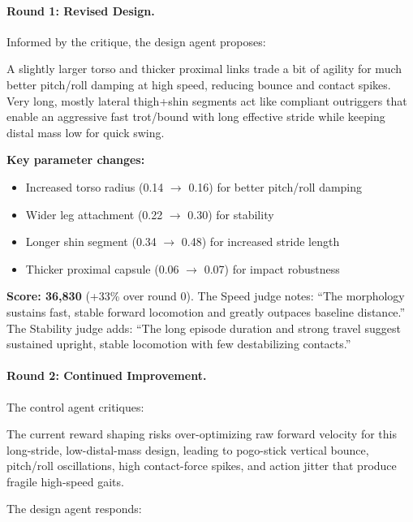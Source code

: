 \paragraph{Round 1: Revised Design.}
Informed by the critique, the design agent proposes:

\begin{promptbox}
A slightly larger torso and thicker proximal links trade a bit of agility for much better pitch/roll damping at high speed, reducing bounce and contact spikes. Very long, mostly lateral thigh+shin segments act like compliant outriggers that enable an aggressive fast trot/bound with long effective stride while keeping distal mass low for quick swing.
\end{promptbox}

\noindent\textbf{Key parameter changes:}
\begin{itemize}[nosep,leftmargin=*]
    \item Increased torso radius (0.14 $\to$ 0.16) for better pitch/roll damping
    \item Wider leg attachment (0.22 $\to$ 0.30) for stability
    \item Longer shin segment (0.34 $\to$ 0.48) for increased stride length
    \item Thicker proximal capsule (0.06 $\to$ 0.07) for impact robustness
\end{itemize}

\noindent\textbf{Score: 36,830} (+33\% over round 0). The Speed judge notes: ``The morphology sustains fast, stable forward locomotion and greatly outpaces baseline distance.'' The Stability judge adds: ``The long episode duration and strong travel suggest sustained upright, stable locomotion with few destabilizing contacts.''

\paragraph{Round 2: Continued Improvement.}
The control agent critiques:

\begin{promptbox}
The current reward shaping risks over-optimizing raw forward velocity for this long-stride, low-distal-mass design, leading to pogo-stick vertical bounce, pitch/roll oscillations, high contact-force spikes, and action jitter that produce fragile high-speed gaits.
\end{promptbox}

\noindent The design agent responds:

